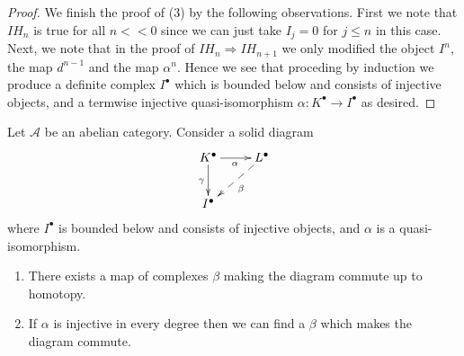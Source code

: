 \begin{proof}
\medskip\noindent
We finish the proof of (3) by the following observations.
First we note that $IH_n$ is true for all $n << 0$ since
we can just take $I_j = 0$ for $j \leq n$ in this case.
Next, we note that in the proof of $IH_n \Rightarrow IH_{n + 1}$
we only modified the object $I^n$, the map $d^{n - 1}$ and
the map $\alpha^n$. Hence we see that proceding by induction
we produce a definite complex $I^\bullet$ which is bounded below
and consists of injective objects, and a termwise
injective quasi-isomorphism $\alpha : K^\bullet \to I^\bullet$ as desired.
\end{proof}

\begin{lemma}
\label{lemma-morphisms-lift}
Let $\mathcal{A}$ be an abelian category.
Consider a solid diagram
$$
\xymatrix{
K^\bullet \ar[r]_\alpha \ar[d]_\gamma & L^\bullet \ar@{-->}[dl]^\beta \\
I^\bullet
}
$$
where $I^\bullet$ is bounded below and consists of injective
objects, and $\alpha$ is a quasi-isomorphism.
\begin{enumerate}
\item There exists a map of complexes $\beta$ making the diagram
commute up to homotopy.
\item If $\alpha$ is injective in every degree
then we can find a $\beta$ which makes the diagram commute.
\end{enumerate}
\end{lemma}

